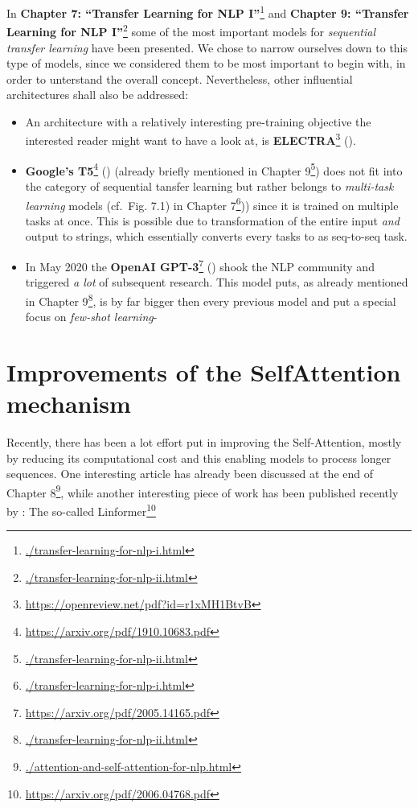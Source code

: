 \documentclass[]{krantz}
\providecommand{\tightlist}{%
  \setlength{\itemsep}{0pt}\setlength{\parskip}{0pt}}
\renewcommand{\href}[2]{#2\footnote{\url{#1}}}
\begin{document}
In \href{./transfer-learning-for-nlp-i.html}{\textbf{Chapter 7: ``Transfer Learning for NLP I''}} and \href{./transfer-learning-for-nlp-ii.html}{\textbf{Chapter 9: ``Transfer Learning for NLP I''}} some of the most important models for \emph{sequential transfer learning} have been presented. We chose to narrow ourselves down to this type of models, since we considered them to be most important to begin with, in order to unterstand the overall concept. Nevertheless, other influential architectures shall also be addressed:

\begin{itemize}
\tightlist
\item
  An architecture with a relatively interesting pre-training objective the interested reader might want to have a look at, is \href{https://openreview.net/pdf?id=r1xMH1BtvB}{\textbf{ELECTRA}} (\citet{Clark2020ELECTRA}).
\item
  \href{https://arxiv.org/pdf/1910.10683.pdf}{\textbf{Google's T5}} (\citet{raffel2019exploring}) (already briefly mentioned in \href{./transfer-learning-for-nlp-ii.html}{Chapter 9}) does not fit into the category of sequential tansfer learning but rather belongs to \emph{multi-task learning} models (cf.~Fig. 7.1) in \href{./transfer-learning-for-nlp-i.html}{Chapter 7})) since it is trained on multiple tasks at once. This is possible due to transformation of the entire input \emph{and} output to strings, which essentially converts every tasks to as seq-to-seq task.
\item
  In May 2020 the \href{https://arxiv.org/pdf/2005.14165.pdf}{\textbf{OpenAI GPT-3}} (\citet{brown2020language}) shook the NLP community and triggered \emph{a lot} of subsequent research. This model puts, as already mentioned in \href{./transfer-learning-for-nlp-ii.html}{Chapter 9}, is by far bigger then every previous model and put a special focus on \emph{few-shot learning}-
\end{itemize}

\hypertarget{improvements-of-the-selfattention-mechanism}{%
\section{Improvements of the SelfAttention mechanism}\label{improvements-of-the-selfattention-mechanism}}

Recently, there has been a lot effort put in improving the Self-Attention, mostly by reducing its computational cost
and this enabling models to process longer sequences. One interesting article has already been discussed at the end of \href{./attention-and-self-attention-for-nlp.html}{Chapter 8}, while another interesting piece of work has been published recently by \citet{wang2020linformer}: The so-called \href{https://arxiv.org/pdf/2006.04768.pdf}{Linformer}
\end{document}

